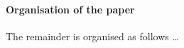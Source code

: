 \documentclass[a4paper, 12pt]{article}
\newcommand{\eg}{{\it e.g.}\ }
\begin{document}
 
% 

\paragraph{Organisation of the paper} The remainder is organised as follows \ldots
%
%
\end{document}
